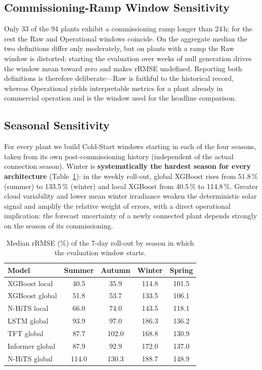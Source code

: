 \documentclass[conference]{IEEEtran}
\begin{document}
\subsection{Commissioning-Ramp Window Sensitivity}
Only 33 of the 94 plants exhibit a commissioning ramp longer than 24\,h; for the rest the
Raw and Operational windows coincide. On the aggregate median the two definitions differ only
moderately, but on plants with a ramp the Raw window is distorted: starting the evaluation
over weeks of null generation drives the window mean toward zero and makes rRMSE undefined.
Reporting both definitions is therefore deliberate---Raw is faithful to the historical record,
whereas Operational yields interpretable metrics for a plant already in commercial operation
and is the window used for the headline comparison.

\subsection{Seasonal Sensitivity}
For every plant we build Cold-Start windows starting in each of the four seasons, taken from
its own post-commissioning history (independent of the actual connection season). Winter is
\textbf{systematically the hardest season for every architecture} (Table~\ref{tab:seasonal}):
in the weekly roll-out, global XGBoost rises from 51.8\,\% (summer) to 133.5\,\% (winter) and
local XGBoost from 40.5\,\% to 114.8\,\%. Greater cloud variability and lower mean winter
irradiance weaken the deterministic solar signal and amplify the relative weight of errors,
with a direct operational implication: the forecast uncertainty of a newly connected plant
depends strongly on the season of its commissioning.

\begin{table}[t]
\centering
\caption{Median rRMSE (\%) of the 7-day roll-out by season in which the evaluation window
starts.}
\label{tab:seasonal}
\begin{tabular}{lcccc}
\toprule
Model & Summer & Autumn & Winter & Spring \\
\midrule
XGBoost local  & 40.5 & 35.9 & 114.8 & 101.5 \\
XGBoost global & 51.8 & 53.7 & 133.5 & 106.1 \\
N-HiTS local   & 66.0 & 74.0 & 143.5 & 118.1 \\
LSTM global    & 93.9 & 97.0 & 186.3 & 136.2 \\
TFT global     & 87.7 & 102.0 & 168.8 & 130.9 \\
Informer global & 87.9 & 92.9 & 172.0 & 137.0 \\
N-HiTS global  & 114.0 & 130.3 & 188.7 & 148.9 \\
\bottomrule
\end{tabular}
\end{table}
\end{document}
